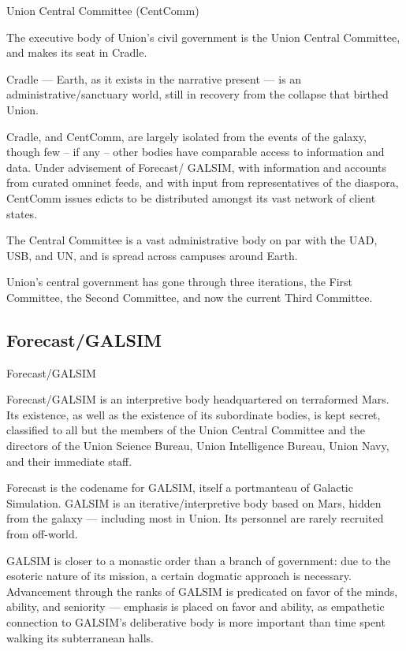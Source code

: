 Union Central Committee (CentComm)  

The executive body of Union’s civil government is the Union Central Committee, and makes its  
seat in Cradle. 
 

Cradle — Earth, as it exists in the narrative present — is an administrative/sanctuary world, still  
in recovery from the collapse that birthed Union. 
 

                                                                                                                     


Cradle, and CentComm, are largely isolated from the events of the galaxy, though few -- if any --  
other bodies have comparable access to information and data. Under advisement of Forecast/ 
GALSIM, with information and accounts from curated omninet feeds, and with input from  
representatives of the diaspora, CentComm issues edicts to be distributed amongst its vast  
network of client states. 
 

The Central Committee  is a vast administrative body on par with the UAD, USB, and UN, and is  
spread across campuses around Earth. 
 

Union’s central government has gone through three iterations, the First Committee, the Second  
Committee, and now the current Third Committee.  
 
\subsection{Forecast/GALSIM}
Forecast/GALSIM   

Forecast/GALSIM is an interpretive body headquartered on terraformed Mars. Its existence, as  
well as the existence of its subordinate bodies, is kept secret, classified to all but the members of  
the Union Central Committee and the directors of the Union Science Bureau, Union Intelligence  
Bureau, Union Navy, and their immediate staff. 
 

Forecast is the codename for GALSIM, itself a portmanteau of Galactic Simulation. GALSIM is an  
iterative/interpretive body based on Mars, hidden from the galaxy — including most in Union. Its  
personnel are rarely recruited from off-world. 
 

GALSIM is closer to a monastic order than a branch of government: due to the esoteric nature of  
its mission, a certain dogmatic approach is necessary. Advancement through the ranks of  
GALSIM is predicated on favor of the minds, ability, and seniority — emphasis is placed on favor  
and ability, as empathetic connection to GALSIM’s deliberative body is more important than time  
spent walking its subterranean halls. 
 

